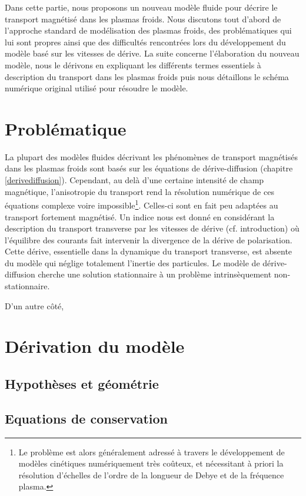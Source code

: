 Dans cette partie, nous proposons un nouveau modèle fluide pour décrire le
transport magnétisé dans les plasmas froids. Nous discutons tout d'abord de
l'approche standard de modélisation des plasmas froids, des problématiques qui
lui sont propres ainsi que des difficultés rencontrées lors du développement du
modèle basé sur les vitesses de dérive. La suite concerne l'élaboration du
nouveau modèle, nous le dérivons en expliquant les différents
termes essentiels à description du transport dans les plasmas froids puis nous
détaillons le schéma numérique original utilisé pour résoudre le modèle.
\section{Problématique}
La plupart des modèles fluides décrivant les phénomènes de transport
magnétisés dans les plasmas froids sont basés sur les équations de
dérive-diffusion (chapitre \ref{derivediffusion}). Cependant, au delà d'une
certaine intensité de champ magnétique, l'anisotropie du transport rend la résolution
numérique de ces équations complexe voire impossible\footnote{Le problème est alors
généralement adressé à travers le développement de
modèles cinétiques numériquement très coûteux, et nécessitant à priori la
résolution d'échelles de l'ordre de la longueur de Debye et de la fréquence plasma.}. 
Celles-ci sont en fait peu adaptées au transport fortement magnétisé. 
Un indice nous est donné en considérant la
description du transport transverse par les vitesses de dérive (cf.
introduction) où l'équilibre des courants fait intervenir la divergence de
la dérive de polarisation. Cette dérive, essentielle dans la dynamique du transport 
transverse, est absente du modèle qui néglige totalement l'inertie des particules. Le modèle de
dérive-diffusion cherche une solution stationnaire à un problème intrinsèquement non-stationnaire.

D'un autre côté, 


\section{Dérivation du modèle}
\subsection{Hypothèses et géométrie}
\subsection{Equations de conservation}
